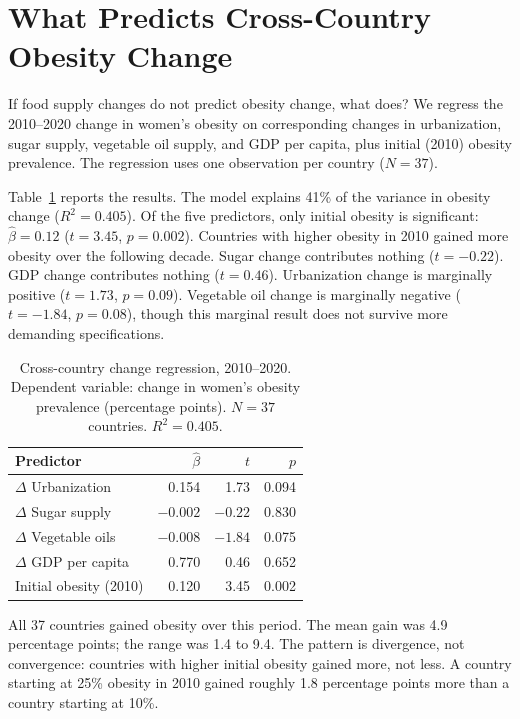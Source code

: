 \documentclass[letterpaper,11pt,leqno]{article}
\begin{document}
\section{What Predicts Cross-Country Obesity Change}

If food supply changes do not predict obesity change, what does? We regress the 2010--2020 change in women's obesity on corresponding changes in urbanization, sugar supply, vegetable oil supply, and GDP per capita, plus initial (2010) obesity prevalence. The regression uses one observation per country ($N = 37$).

Table~\ref{tab:change} reports the results. The model explains 41\% of the variance in obesity change ($R^2 = 0.405$). Of the five predictors, only initial obesity is significant: $\hat{\beta} = 0.12$ ($t = 3.45$, $p = 0.002$). Countries with higher obesity in 2010 gained more obesity over the following decade. Sugar change contributes nothing ($t = -0.22$). GDP change contributes nothing ($t = 0.46$). Urbanization change is marginally positive ($t = 1.73$, $p = 0.09$). Vegetable oil change is marginally negative ($t = -1.84$, $p = 0.08$), though this marginal result does not survive more demanding specifications.

\begin{table}[htbp]
\caption{Cross-country change regression, 2010--2020. Dependent variable: change in women's obesity prevalence (percentage points). $N = 37$ countries. $R^2 = 0.405$.}
\label{tab:change}
\begin{tabular*}{\textwidth}{@{\extracolsep\fill}lrrr}
\toprule
Predictor & $\hat{\beta}$ & $t$ & $p$ \\
\midrule
$\Delta$ Urbanization & 0.154 & 1.73 & 0.094 \\
$\Delta$ Sugar supply & $-0.002$ & $-0.22$ & 0.830 \\
$\Delta$ Vegetable oils & $-0.008$ & $-1.84$ & 0.075 \\
$\Delta$ GDP per capita & 0.770 & 0.46 & 0.652 \\
Initial obesity (2010) & 0.120 & 3.45 & 0.002 \\
\bottomrule
\end{tabular*}
\end{table}

All 37 countries gained obesity over this period. The mean gain was 4.9 percentage points; the range was 1.4 to 9.4. The pattern is divergence, not convergence: countries with higher initial obesity gained more, not less. A country starting at 25\% obesity in 2010 gained roughly 1.8 percentage points more than a country starting at 10\%.
\end{document}
